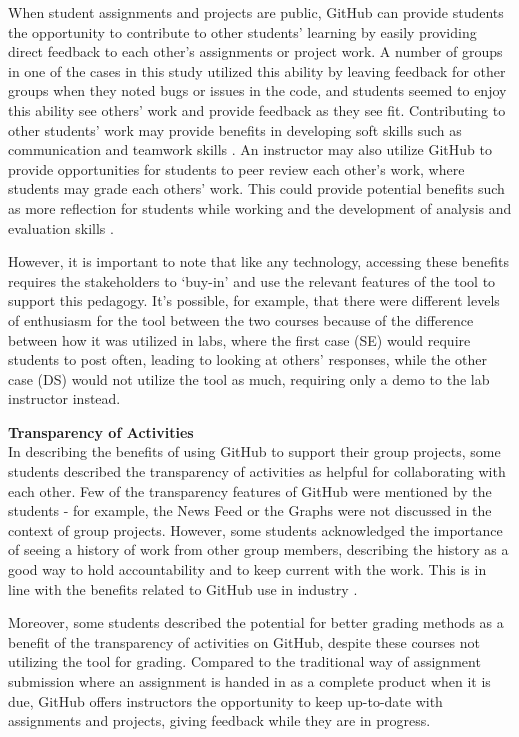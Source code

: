 When student assignments and projects are public, GitHub can provide students the opportunity to contribute to other students' learning by easily providing direct feedback to each other's assignments or project work. A number of groups in one of the cases in this study utilized this ability by leaving feedback for other groups when they noted bugs or issues in the code, and students seemed to enjoy this ability see others' work and provide feedback as they see fit. Contributing to other students' work may provide benefits in developing soft skills such as communication and teamwork skills \cite{hamer2006some}. An instructor may also utilize GitHub to provide opportunities for students to peer review each other's work, where students may grade each others' work. This could provide potential benefits such as more reflection for students while working and the development of analysis and evaluation skills \cite{sondergaard2012collaborative}.

However, it is important to note that like any technology, accessing these benefits requires the stakeholders to `buy-in' and use the relevant features of the tool to support this pedagogy. It's possible, for example, that there were different levels of enthusiasm for the tool between the two courses because of the difference between how it was utilized in labs, where the first case (SE) would require students to post often, leading to looking at others' responses, while the other case (DS) would not utilize the tool as much, requiring only a demo to the lab instructor instead.

\textbf{Transparency of Activities} \\
In describing the benefits of using GitHub to support their group projects, some students described the transparency of activities as helpful for collaborating with each other. Few of the transparency features of GitHub were mentioned by the students - for example, the News Feed or the Graphs were not discussed in the context of group projects. However, some students acknowledged the importance of seeing a history of work from other group members, describing the history as a good way to hold accountability and to keep current with the work. This is in line with the benefits related to GitHub use in industry \cite{dabbish2012social}.

Moreover, some students described the potential for better grading methods as a benefit of the transparency of activities on GitHub, despite these courses not utilizing the tool for grading. Compared to the traditional way of assignment submission where an assignment is handed in as a complete product when it is due, GitHub offers instructors the opportunity to keep up-to-date with assignments and projects, giving feedback while they are in progress.

